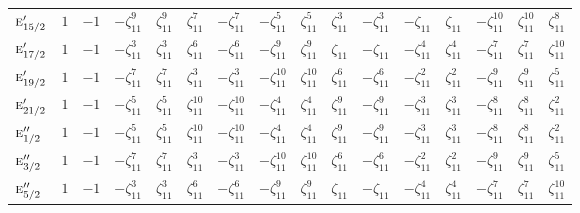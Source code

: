 \documentclass[10pt,a4paper]{article}
\numberwithin{equation}{section}
\newcommand{\irr}[1]{\text{\normalfont\scshape #1}}
\newcommand{\rootunity}[1]{\zeta_{#1}}
\begin{document}
{\begin{longtable}{@{}lccccccccccccccc@{}}
$\irr{e}_{15/2}'$ & $1$ & $-1$ & $-\rootunity{11}^{9}$ & $\rootunity{11}^{9}$ & $\rootunity{11}^{7}$ & $-\rootunity{11}^{7}$ & $-\rootunity{11}^{5}$ & $\rootunity{11}^{5}$ & $\rootunity{11}^{3}$ & $-\rootunity{11}^{3}$ & $-\rootunity{11}$ & $\rootunity{11}$ & $-\rootunity{11}^{10}$ & $\rootunity{11}^{10}$ & $\rootunity{11}^{8}$\\
$\irr{e}_{17/2}'$ & $1$ & $-1$ & $-\rootunity{11}^{3}$ & $\rootunity{11}^{3}$ & $\rootunity{11}^{6}$ & $-\rootunity{11}^{6}$ & $-\rootunity{11}^{9}$ & $\rootunity{11}^{9}$ & $\rootunity{11}$ & $-\rootunity{11}$ & $-\rootunity{11}^{4}$ & $\rootunity{11}^{4}$ & $-\rootunity{11}^{7}$ & $\rootunity{11}^{7}$ & $\rootunity{11}^{10}$\\
$\irr{e}_{19/2}'$ & $1$ & $-1$ & $-\rootunity{11}^{7}$ & $\rootunity{11}^{7}$ & $\rootunity{11}^{3}$ & $-\rootunity{11}^{3}$ & $-\rootunity{11}^{10}$ & $\rootunity{11}^{10}$ & $\rootunity{11}^{6}$ & $-\rootunity{11}^{6}$ & $-\rootunity{11}^{2}$ & $\rootunity{11}^{2}$ & $-\rootunity{11}^{9}$ & $\rootunity{11}^{9}$ & $\rootunity{11}^{5}$\\
$\irr{e}_{21/2}'$ & $1$ & $-1$ & $-\rootunity{11}^{5}$ & $\rootunity{11}^{5}$ & $\rootunity{11}^{10}$ & $-\rootunity{11}^{10}$ & $-\rootunity{11}^{4}$ & $\rootunity{11}^{4}$ & $\rootunity{11}^{9}$ & $-\rootunity{11}^{9}$ & $-\rootunity{11}^{3}$ & $\rootunity{11}^{3}$ & $-\rootunity{11}^{8}$ & $\rootunity{11}^{8}$ & $\rootunity{11}^{2}$\\
$\irr{e}_{1/2}''$ & $1$ & $-1$ & $-\rootunity{11}^{5}$ & $\rootunity{11}^{5}$ & $\rootunity{11}^{10}$ & $-\rootunity{11}^{10}$ & $-\rootunity{11}^{4}$ & $\rootunity{11}^{4}$ & $\rootunity{11}^{9}$ & $-\rootunity{11}^{9}$ & $-\rootunity{11}^{3}$ & $\rootunity{11}^{3}$ & $-\rootunity{11}^{8}$ & $\rootunity{11}^{8}$ & $\rootunity{11}^{2}$\\
$\irr{e}_{3/2}''$ & $1$ & $-1$ & $-\rootunity{11}^{7}$ & $\rootunity{11}^{7}$ & $\rootunity{11}^{3}$ & $-\rootunity{11}^{3}$ & $-\rootunity{11}^{10}$ & $\rootunity{11}^{10}$ & $\rootunity{11}^{6}$ & $-\rootunity{11}^{6}$ & $-\rootunity{11}^{2}$ & $\rootunity{11}^{2}$ & $-\rootunity{11}^{9}$ & $\rootunity{11}^{9}$ & $\rootunity{11}^{5}$\\
$\irr{e}_{5/2}''$ & $1$ & $-1$ & $-\rootunity{11}^{3}$ & $\rootunity{11}^{3}$ & $\rootunity{11}^{6}$ & $-\rootunity{11}^{6}$ & $-\rootunity{11}^{9}$ & $\rootunity{11}^{9}$ & $\rootunity{11}$ & $-\rootunity{11}$ & $-\rootunity{11}^{4}$ & $\rootunity{11}^{4}$ & $-\rootunity{11}^{7}$ & $\rootunity{11}^{7}$ & $\rootunity{11}^{10}$\\

\end{longtable}}
\end{document}
